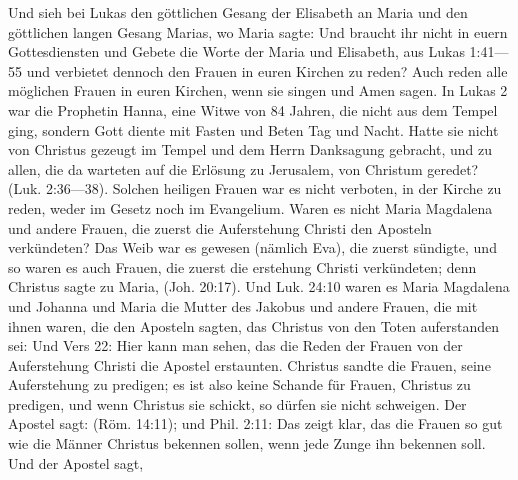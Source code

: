 {    Und sieh bei Lukas den göttlichen Gesang der Elisabeth an
    Maria und den göttlichen langen Gesang Marias, wo Maria sagte:
     Und braucht
    ihr nicht in euern Gottesdiensten und Gebete die Worte der
    Maria und Elisabeth, aus Lukas 1:41—55 
    und verbietet dennoch
    den Frauen in euren Kirchen zu reden? Auch reden alle möglichen
    Frauen in euren Kirchen, wenn sie singen und Amen sagen. In
    Lukas 2 war die Prophetin Hanna, eine Witwe von 84 Jahren,
    die nicht aus dem Tempel ging, sondern Gott diente mit Fasten
    und Beten Tag und Nacht. Hatte sie nicht von Christus 
    gezeugt im Tempel und dem Herrn Danksagung gebracht, und zu
    allen, die da warteten auf die Erlösung zu Jerusalem, von
    Christum geredet? (Luk. 2:36—38). 
    Solchen heiligen Frauen
    war es nicht verboten, in der Kirche zu reden, weder im Gesetz
    noch im Evangelium. Waren es nicht Maria Magdalena und
    andere Frauen, die zuerst die Auferstehung Christi den Aposteln
    verkündeten? Das Weib war es gewesen (nämlich Eva), die
    zuerst sündigte, und so waren es auch Frauen, die zuerst die  
    erstehung Christi verkündeten; denn Christus sagte zu Maria, 
    (Joh. 20:17). Und 
    Luk. 24:10 waren es Maria Magdalena und
    Johanna und Maria die Mutter des Jakobus und andere Frauen,
    die mit ihnen waren, die den Aposteln sagten, das Christus von
    den Toten auferstanden sei:  Und Vers 22:
     Hier
    kann man sehen, das die Reden der Frauen von der Auferstehung
    Christi die Apostel erstaunten. Christus sandte die Frauen, seine
    Auferstehung zu predigen; es ist also keine Schande für Frauen,
    Christus zu predigen, und wenn Christus sie schickt, so dürfen sie
    nicht schweigen. Der Apostel sagt: 
    (Röm. 14:11); und Phil. 2:11: 
     Das zeigt
    klar, das die Frauen so gut wie die Männer Christus bekennen
    sollen, wenn jede Zunge ihn bekennen soll. Und der Apostel sagt,
}
